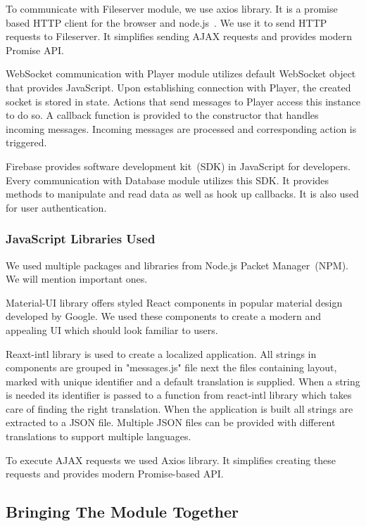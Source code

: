 To communicate with Fileserver module, we use axios library. It is a promise based HTTP client for the browser and node.js~\citep{axios}. We use it to send HTTP requests to Fileserver. It simplifies sending AJAX requests and provides modern Promise API. 
\par
WebSocket communication with Player module utilizes default WebSocket object that provides JavaScript. Upon establishing connection with Player, the created socket is stored in state. Actions that send messages to Player access this instance to do so. A callback function is provided to the constructor that handles incoming messages. Incoming messages are processed and corresponding action is triggered.
\par
Firebase provides software development kit~(SDK) in JavaScript for developers. Every communication with Database module utilizes this SDK. It provides methods to manipulate and read data as well as hook up callbacks. It is also used for user authentication.

\subsubsection{JavaScript Libraries Used}

We used multiple packages and libraries from Node.js Packet Manager~(NPM). We will mention important ones.
\par
Material-UI library offers styled React components in popular material design developed by Google. We used these components to create a modern and appealing UI which should look familiar to users.
\par
Reaxt-intl library is used to create a localized application. All strings in components are grouped in "messages.js" file next the files containing layout, marked with unique identifier and a default translation is supplied. When a string is needed its identifier is passed to a function from react-intl library which takes care of finding the right translation. When the application is built all strings are extracted to a JSON file. Multiple JSON files can be provided with different translations to support multiple languages.
\par
To execute AJAX requests we used Axios library. It simplifies creating these requests and provides modern Promise-based API.

\subsection{Bringing The Module Together}


